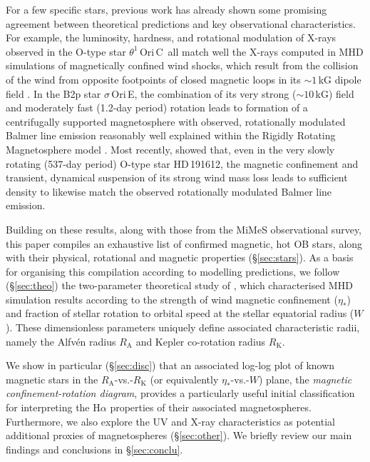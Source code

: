 \documentclass[useAMS,usenatbib]{mn2e}
\newcommand{\etas}{\eta_\ast}
\newcommand{\ra}{R_\mathrm{A}}
\newcommand{\rk}{R_\mathrm{K}}
\newcommand{\oriunc}{$\theta^1$\,Ori\,C}
\newcommand{\sigorie}{$\sigma$\,Ori\,E}
\begin{document}
For a few specific stars, previous work has already shown some promising agreement between theoretical predictions and key observational characteristics. 
For example, the luminosity, hardness, and rotational modulation of X-rays observed in the O-type star \oriunc\ all match well the X-rays computed in MHD simulations of magnetically confined wind shocks, which result from the collision of the wind from opposite footpoints of closed magnetic loops in its $\sim1$\,kG dipole field \citep{2005ApJ...628..986G}.
In the B2p star \sigorie, the combination of its very strong ($\sim 10$\,kG) field and moderately fast (1.2-day period) rotation leads to formation of a centrifugally supported magnetosphere with observed, rotationally modulated Balmer line emission reasonably well explained within the Rigidly Rotating Magnetosphere model \citep[RRM;][]{2005MNRAS.357..251T,2005ApJ...630L..81T}. 
Most recently, \citet{2012MNRAS.423L..21S} showed that, even in the very slowly rotating (537-day period) O-type star HD\,191612, the magnetic confinement and transient, dynamical suspension of its strong wind mass loss leads to sufficient density to likewise match the observed rotationally modulated Balmer line emission.



Building on these results, along with those from the MiMeS observational survey, this paper compiles an exhaustive list of confirmed magnetic, hot OB stars, along with their physical, rotational and magnetic properties (\S \ref{sec:stars}). 
As a basis for organising this compilation according to modelling predictions, we follow (\S \ref{sec:theo})  the two-parameter theoretical study of \citet{2008MNRAS.385...97U}, which characterised MHD simulation results according to the strength of wind magnetic confinement ($\etas$) and  fraction of stellar rotation to orbital speed at the stellar equatorial radius ($W$). 
These dimensionless parameters uniquely define associated characteristic radii, namely the Alfv\'en radius $\ra$ and Kepler co-rotation radius $\rk$.


We show in particular (\S \ref{sec:disc}) that an associated log-log plot of known magnetic stars in the $\ra$-vs.-$\rk$ (or equivalently  $\etas$-vs.-$W$) plane, the \textit{magnetic confinement-rotation diagram}, provides a particularly useful initial classification for interpreting the H$\alpha$ properties of their associated magnetospheres. Furthermore, we also explore the UV and X-ray characteristics as potential additional proxies of magnetospheres (\S \ref{sec:other}). 
We briefly review our main findings and conclusions in \S \ref{sec:conclu}.
\end{document}
